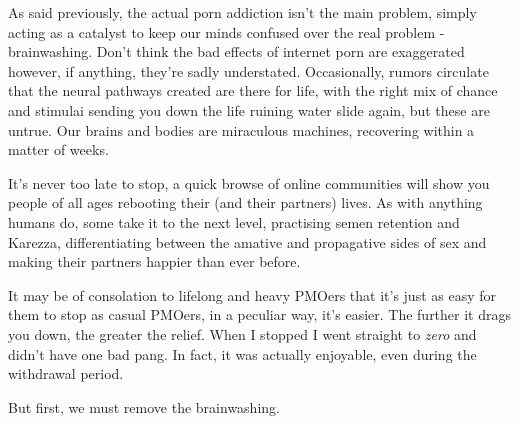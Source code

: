 \documentclass[easypeasy.tex]{subfiles}
\begin{document}
As said previously, the actual porn addiction isn't the main problem, simply acting as a catalyst to keep our minds confused over the real problem - brainwashing. Don't think the bad effects of internet porn are exaggerated however, if anything, they're sadly understated. Occasionally, rumors circulate that the neural pathways created are there for life, with the right mix of chance and stimulai sending you down the life ruining water slide again, but these are untrue. Our brains and bodies are miraculous machines, recovering within a matter of weeks.

It's never too late to stop, a quick browse of online communities will show you people of all ages rebooting their (and their partners) lives. As with anything humans do, some take it to the next level, practising semen retention and Karezza, differentiating between the amative and propagative sides of sex and making their partners happier than ever before.

It may be of consolation to lifelong and heavy PMOers that it's just as easy for them to stop as casual PMOers, in a peculiar way, it's easier. The further it drags you down, the greater the relief. When I stopped I went straight to \textit{zero} and didn't have one bad pang. In fact, it was actually enjoyable, even during the withdrawal period.

But first, we must remove the brainwashing.
\end{document}
